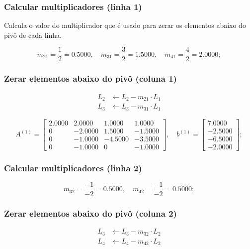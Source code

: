 \documentclass[12pt,a4paper]{article}
\begin{document}
\subsubsection{Calcular multiplicadores (linha 1)}

Calcula o valor do multiplicador que é usado para zerar os elementos abaixo do pivô de cada linha.

\[
m_{21} = \frac{1}{2} = 0.5000, \quad m_{31} = \frac{3}{2} = 1.5000, \quad m_{41} = \frac{4}{2} = 2.0000;
\]

\subsubsection{Zerar elementos abaixo do pivô (coluna 1)}

\[
\begin{aligned}
L_2 &\leftarrow L_2 - m_{21} \cdot L_1 \\
L_3 &\leftarrow L_3 - m_{31} \cdot L_1
\end{aligned}
\]

\[
A^{(1)} = \begin{bmatrix}
2.0000 & 2.0000 & 1.0000 & 1.0000 \\
0 & -2.0000 & 1.5000 & -1.5000 \\
0 & -1.0000 & -4.5000 & -3.5000 \\
0 & -1.0000 & 0 & -1.0000
\end{bmatrix},
\quad
b^{(1)} = \begin{bmatrix}
7.0000 \\ -2.5000 \\ -6.5000 \\ -2.0000
\end{bmatrix};
\]

\subsubsection{Calcular multiplicadores (linha 2)}

\[
m_{32} = \frac{-1}{-2} = 0.5000, \quad m_{42} = \frac{-1}{-2} = 0.5000;
\]

\subsubsection{Zerar elementos abaixo do pivô (coluna 2)}

\[
\begin{aligned}
L_3 &\leftarrow L_3 - m_{32} \cdot L_2 \\
L_4 &\leftarrow L_4 - m_{42} \cdot L_2
\end{aligned}
\]
\end{document}
